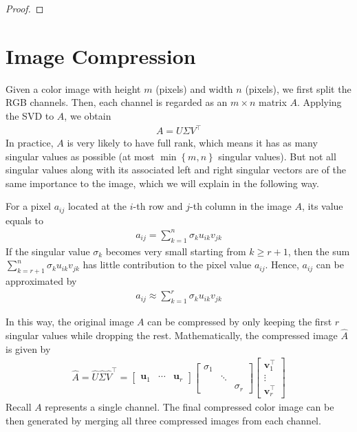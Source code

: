 \documentclass[color=blue, thmcnt=section, 12pt]{elegantbook}
\begin{document}
\begin{proof}
\end{proof}


\section{Image Compression}


\par Given a color image with height $m$ (pixels) and width $n$ (pixels), we first split the RGB channels. Then, each channel is regarded as an $m \times n$ matrix $A$. Applying the SVD to $A$, we obtain
\begin{align*}
    A = U \Sigma V^\top
\end{align*}
In practice, $A$ is very likely to have full rank, which means it has as many singular values as possible (at most $\min\left\{m, n\right\}$ singular values). But not all singular values along with its associated left and right singular vectors are of the same importance to the image, which we will explain in the following way.

\par For a pixel $a_{ij}$ located at the $i$-th row and $j$-th column in the image $A$, its value equals to 
\begin{align*}
    a_{ij} = \sum_{k=1}^n \sigma_k u_{ik} v_{jk}
\end{align*}
If the singular value $\sigma_k$ becomes very small starting from $k \geq r+1$, then the sum $\sum_{k=r+1}^n \sigma_k u_{ik} v_{jk}$ has little contribution to the pixel value $a_{ij}$. Hence, $a_{ij}$ can be approximated by 
\begin{align*}
    a_{ij} \approx \sum_{k=1}^r \sigma_k u_{ik} v_{jk}
\end{align*}

\par In this way, the original image $A$ can be compressed by only keeping the first $r$ singular values while dropping the rest. Mathematically, the compressed image $\hat{A}$ is given by
\begin{align*}
    \hat{A} = \hat{U} \hat{\Sigma} \hat{V}^\top
    = \begin{bmatrix}
        \mathbf{u}_1 & \cdots & \mathbf{u}_r
    \end{bmatrix} \begin{bmatrix}
        \sigma_1 & & \\ 
        & \ddots & \\ 
        & & \sigma_r
    \end{bmatrix} \begin{bmatrix}
        \mathbf{v}^\top_1 \\ \vdots \\ \mathbf{v}^\top_r
    \end{bmatrix}
\end{align*}
Recall $A$ represents a single channel. The final compressed color image can be then generated by merging all three compressed images from each channel.
\end{document}
